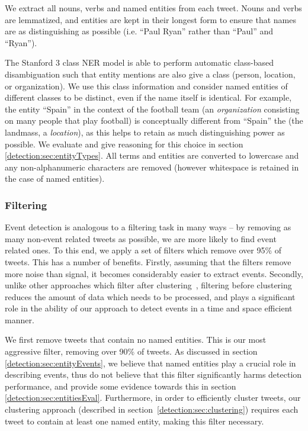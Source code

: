 We extract all nouns, verbs and named entities from each tweet.
Nouns and verbs are lemmatized, and entities are kept in their longest form to ensure that names are as distinguishing as possible  (i.e. ``Paul Ryan'' rather than ``Paul'' and ``Ryan'').

The Stanford 3 class NER model is able to perform automatic class-based disambiguation such that entity mentions are also give a class (person, location, or organization).
We use this class information and consider named entities of different classes to be distinct, even if the name itself is identical.
For example, the entity ``Spain'' in the context of the football team (an \emph{organization} consisting on many people that play football) is conceptually different from ``Spain'' the (the landmass, a \emph{location}), as this helps to retain as much distinguishing power as possible.
We evaluate and give reasoning for this choice in section \ref{detection:sec:entityTypes}.
All terms and entities are converted to lowercase and any non-alphanumeric characters are removed (however whitespace is retained in the case of named entities).

\subsubsection{Filtering}
Event detection is analogous to a filtering task in many ways -- by removing as many non-event related tweets as possible, we are more likely to find event related ones. To this end, we apply a set of filters which remove over 95\% of tweets.
This has a number of benefits.
Firstly, assuming that the filters remove more noise than signal, it becomes considerably easier to extract events.
Secondly, unlike other approaches which filter after clustering~\citep{Petrovic:2010:SFS:1857999.1858020,becker2011beyond}, filtering before clustering reduces the amount of data which needs to be processed, and plays a significant role in the ability of our approach to detect events in a time and space efficient manner.

We first remove tweets that contain no named entities.
This is our most aggressive filter, removing over 90\% of tweets.
As discussed in section \ref{detection:sec:entityEvents}, we believe that named entities play a crucial role in describing events, thus do not believe that this filter significantly harms detection performance, and provide some evidence towards this in section \ref{detection:sec:entitiesEval}.
Furthermore, in order to efficiently cluster tweets, our clustering approach (described in section~\ref{detection:sec:clustering}) requires each tweet to contain at least one named entity, making this filter necessary.


